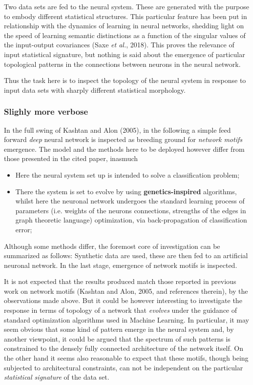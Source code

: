 \documentclass[a4paper,12pt]{article}
\begin{document}
Two data sets are fed to the neural system. These are generated with the purpose to embody different statistical structures. This particular feature has been put in relationship with the dynamics of learning in neural networks, shedding light on the speed of learning semantic distinctions as a function of the singular values of the input-output covariances (Saxe \textit{et al.}, 2018). This proves the relevance of input statistical signature, but nothing is said about the emergence of particular topological patterns in the connections between neurons in the neural network. 

Thus the task here is to inspect the topology of the neural system in response to input data sets with sharply different statistical morphology.

\subsubsection*{Slighly more verbose}

In the full swing of Kashtan and Alon (2005), in the following a simple feed forward \textit{deep} neural network is inspected as breeding ground for \textit{network motifs} emergence. The model and the methods here to be deployed however differ from those presented in the cited paper, inasmuch

\begin{itemize}
	\item Here the neural system set up is intended to solve a classification problem;
	\item There the system is set to evolve by using \textbf{genetics-inspired} algorithms, whilst here the neuronal network undergoes the standard learning process of parameters (i.e. weights of the neurons connections, strengths of the edges in graph theoretic language) optimization, via back-propagation of classification error;
\end{itemize}


Although some methods differ, the foremost core of investigation can be summarized as follows: Synthetic data are used, these are then fed to an artificial neuronal network. In the last stage, emergence of network motifs is inspected. 

It is not expected that the results produced match those reported in previous work on network motifs (Kashtan and Alon, 2005, and references therein), by the observations made above. But it could be however interesting to investigate the response in terms of topology of a network that \textit{evolves} under the guidance of standard optimization algorithms used in Machine Learning. In particular, it may seem obvious that some kind of pattern emerge in the neural system and, by another viewpoint, it could be argued that the spectrum of such patterns is constrained to the densely fully connected architecture of the network itself. On the other hand it seems also reasonable to expect that these motifs, though being subjected to architectural constraints, can not be independent on the particular \textit{statistical signature} of the data set.
\end{document}
